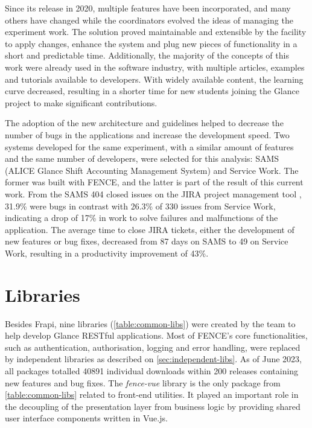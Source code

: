 Since its release in 2020, multiple features have been incorporated, and many others have changed while the coordinators evolved the ideas of managing the experiment work. The solution proved maintainable and extensible by the facility to apply changes, enhance the system and plug new pieces of functionality in a short and predictable time. Additionally, the majority of the concepts of this work were already used in the software industry, with multiple articles, examples and tutorials available to developers. With widely available content, the learning curve decreased, resulting in a shorter time for new students joining the Glance project to make significant contributions.

The adoption of the new architecture and guidelines helped to decrease the number of bugs in the applications and increase the development speed. Two systems developed for the same experiment, with a similar amount of features and the same number of developers, were selected for this analysis: SAMS (ALICE Glance Shift Accounting Management System) \cite{heron-tcc} and Service Work. The former was built with FENCE, and the latter is part of the result of this current work. From the SAMS 404 closed issues on the JIRA project management tool \cite{jira}, 31.9\% were bugs in contrast with 26.3\% of 330 issues from Service Work, indicating a drop of 17\% in work to solve failures and malfunctions of the application. The average time to close JIRA tickets, either the development of new features or bug fixes, decreased from 87 days on SAMS to 49 on Service Work, resulting in a productivity improvement of 43\%.

\section{Libraries}

Besides Frapi, nine libraries (\autoref{table:common-libs}) were created by the team to help develop Glance RESTful applications. Most of FENCE's core functionalities, such as authentication, authorisation, logging and error handling, were replaced by independent libraries as described on \autoref{sec:independent-libs}. As of June 2023, all packages totalled 40891 individual downloads within 200 releases containing new features and bug fixes. The \textit{fence-vue} \cite{fence-vue} \cite{de-jesus-tcc} library is the only package from \autoref{table:common-libs} related to front-end utilities. It played an important role in the decoupling of the presentation layer from business logic by providing shared user interface components written in Vue.js.

